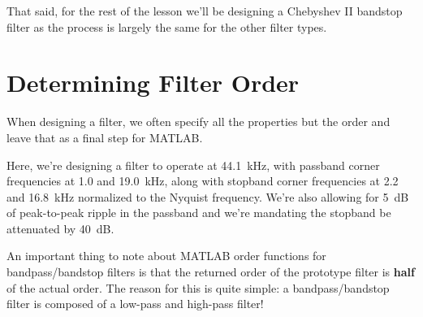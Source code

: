 \documentclass{article}
\begin{document}
That said, for the rest of the lesson we'll be designing a Chebyshev II
bandstop filter as the process is largely the same for the other filter
types.

\section{Determining Filter Order}

When designing a filter, we often specify all the properties but the
order and leave that as a final step for MATLAB.


Here, we're designing a filter to operate at 44.1~kHz, with passband
corner frequencies at 1.0 and 19.0~kHz, along with stopband corner
frequencies at 2.2 and 16.8~kHz normalized to the Nyquist frequency.
We're also allowing for 5~dB of peak-to-peak ripple in the passband and
we're mandating the stopband be attenuated by 40~dB.

An important thing to note about MATLAB order functions for
bandpass/bandstop filters is that the returned order of the prototype
filter is \textbf{half} of the actual order.  The reason for this is
quite simple: a bandpass/bandstop filter is composed of a low-pass and
high-pass filter!
\end{document}

